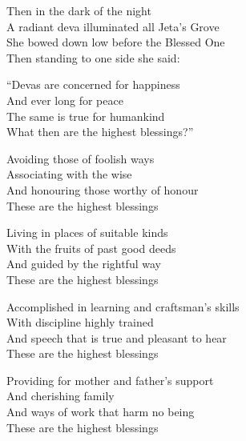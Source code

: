 
\begin{english-only}
  Then in the dark of the night\\
  A radiant deva illuminated all Jeta's Grove\\
  She bowed down low before the Blessed One\\
  Then standing to one side she said:
\end{english-only}

\begin{english-only}
  ``Devas are concerned for happiness\\
  And ever long for peace\\
  The same is true for humankind\\
  What then are the highest blessings?''
\end{english-only}

\begin{english-only}
  Avoiding those of foolish ways\\
  Associating with the wise\\
  And honouring those worthy of honour\\
  These are the highest blessings
\end{english-only}

\begin{english-only}
  Living in places of suitable kinds\\
  With the fruits of past good deeds\\
  And guided by the rightful way\\
  These are the highest blessings
\end{english-only}

\begin{english-only}
  Accomplished in learning and craftsman's skills\\
  With discipline highly trained\\
  And speech that is true and pleasant to hear\\
  These are the highest blessings
\end{english-only}

\begin{english-only}
  Providing for mother and father's support\\
  And cherishing family\\
  And ways of work that harm no being\\
  These are the highest blessings
\end{english-only}

